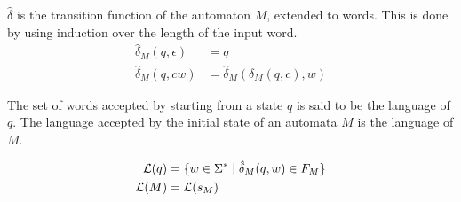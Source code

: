 \begin{definition}
    $\hat\delta$ is the transition function of the automaton $M$, extended to words.
    This is done by using induction over the length of the input word.
    \begin{align}
        \hat\delta_M(q, \epsilon) &= q\\
        \hat\delta_M(q, c w) &= \hat\delta_M(\delta_M(q, c), w)
    \end{align}
\end{definition}

\begin{definition}
    The set of words accepted by starting from a state $q$ is said to be the language of $q$.
    The language accepted by the initial state of an automata $M$ is the language of $M$.

    \begin{align}
        \mathcal{L}(q) &= \{ w \in \Sigma^\ast \mid \hat\delta_M(q, w) \in F_M \}\\
        \mathcal{L}(M) &= \mathcal{L}(s_M)
    \end{align}
\end{definition}
